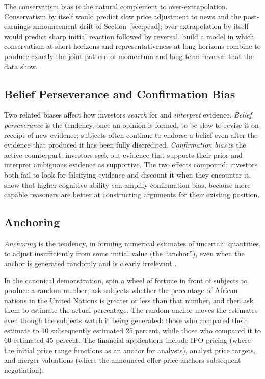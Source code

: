 The conservatism bias is the natural complement to over-extrapolation. Conservatism by itself would predict slow price adjustment to news and the post-earnings-announcement drift of Section~\ref{sec:pead}; over-extrapolation by itself would predict sharp initial reaction followed by reversal. \citet{barberis1998} build a model in which conservatism at short horizons and representativeness at long horizons combine to produce exactly the joint pattern of momentum and long-term reversal that the data show.

\subsection{Belief Perseverance and Confirmation Bias}

Two related biases affect how investors \emph{search} for and \emph{interpret} evidence. \emph{Belief perseverance} is the tendency, once an opinion is formed, to be slow to revise it on receipt of new evidence; subjects often continue to endorse a belief even after the evidence that produced it has been fully discredited. \emph{Confirmation bias} is the active counterpart: investors seek out evidence that supports their prior and interpret ambiguous evidence as supportive. The two effects compound: investors both fail to look for falsifying evidence and discount it when they encounter it. \citet{stanovich2013} show that higher cognitive ability can amplify confirmation bias, because more capable reasoners are better at constructing arguments for their existing position.

\subsection{Anchoring}

\begin{definition}[Anchoring]
\label{def:anchoring}
\emph{Anchoring} is the tendency, in forming numerical estimates of uncertain quantities, to adjust insufficiently from some initial value (the ``anchor''), even when the anchor is generated randomly and is clearly irrelevant \citep{kahneman1974}.
\end{definition}

In the canonical demonstration, \citet{kahneman1974} spin a wheel of fortune in front of subjects to produce a random number, ask subjects whether the percentage of African nations in the United Nations is greater or less than that number, and then ask them to estimate the actual percentage. The random anchor moves the estimates even though the subjects watch it being generated: those who compared their estimate to 10 subsequently estimated 25 percent, while those who compared it to 60 estimated 45 percent. The financial applications include IPO pricing (where the initial price range functions as an anchor for analysts), analyst price targets, and merger valuations (where the announced offer price anchors subsequent negotiation).

